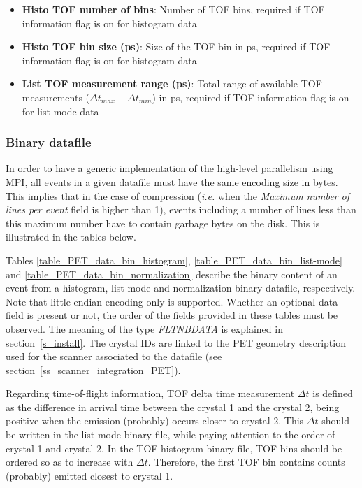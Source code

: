 \documentclass[a4paper, 11pt]{article}
\begin{document}
\begin{itemize}
  \item \textbf{Histo TOF number of bins}: Number of TOF bins, required if TOF information flag is on for histogram data
  \item \textbf{Histo TOF bin size (ps)}: Size of the TOF bin in ps, required if TOF information flag is on for histogram data
  \item \textbf{List TOF measurement range (ps)}: Total range of available TOF measurements ($\Delta t_{max} -\Delta t_{min}$) in ps, required if TOF information flag is on for list mode data
\end{itemize}

\subsubsection{Binary datafile}

In order to have a generic implementation of the high-level parallelism using MPI, all events in a given datafile must have the same encoding size in bytes.
This implies that in the case of compression (\textit{i.e.} when the \textit{Maximum number of lines per event} field is higher than 1), events including a number
of lines less than this maximum number have to contain garbage bytes on the disk. This is illustrated in the tables below.

Tables \ref{table_PET_data_bin_histogram}, \ref{table_PET_data_bin_list-mode} and \ref{table_PET_data_bin_normalization} describe the binary content of
an event from a histogram, list-mode and normalization binary datafile, respectively. Note that little endian encoding only is supported. Whether an
optional data field is present or not, the order of the fields provided in these tables must be observed. The meaning of the type \textit{FLTNBDATA} is
explained in section~\ref{s_install}. The crystal IDs are linked to the PET geometry description used for the scanner associated to the datafile (see
section~\ref{ss_scanner_integration_PET}).

Regarding time-of-flight information, TOF delta time measurement $\Delta t$ is defined as the difference in arrival time between the crystal 1 and the crystal 2, being positive when the emission (probably) occurs closer to crystal 2. This $\Delta t$ should be written in the list-mode binary file, while paying attention to the order of crystal 1 and crystal 2. In the TOF histogram binary file, TOF bins should be ordered so as to increase with $\Delta t$. Therefore, the first TOF bin contains counts (probably) emitted closest to crystal 1.
\end{document}
